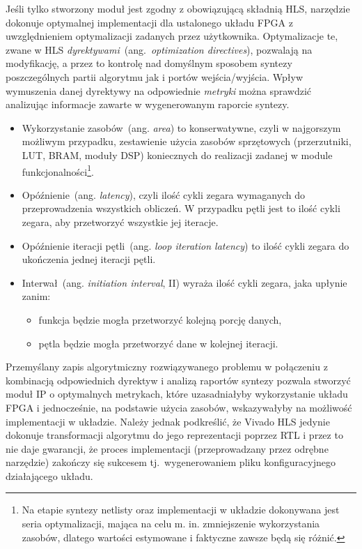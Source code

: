 Jeśli tylko stworzony moduł jest zgodny z obowiązującą składnią HLS, narzędzie dokonuje optymalnej implementacji dla ustalonego układu FPGA z uwzględnieniem optymalizacji zadanych przez użytkownika. Optymalizacje te, zwane w HLS \textit{dyrektywami}~(ang.~\textit{optimization directives}), pozwalają na modyfikację, a przez to kontrolę nad domyślnym sposobem syntezy poszczególnych partii algorytmu jak i portów wejścia/wyjścia. Wpływ wymuszenia danej dyrektywy na odpowiednie \textit{metryki} można sprawdzić analizując informacje zawarte w wygenerowanym raporcie syntezy.
\begin{itemize}
\item Wykorzystanie zasobów~(ang. \textit{area}) to konserwatywne, czyli w najgorszym możliwym przypadku, zestawienie użycia zasobów sprzętowych (przerzutniki, LUT, BRAM, moduły DSP) koniecznych do realizacji zadanej w module funkcjonalności\footnote{Na etapie syntezy netlisty oraz implementacji w układzie dokonywana jest seria optymalizacji, mająca na celu m. in. zmniejszenie wykorzystania zasobów, dlatego wartości estymowane i faktyczne zawsze będą się różnić.}. 
\item Opóźnienie~(ang. \textit{latency}), czyli ilość cykli zegara wymaganych do przeprowadzenia wszystkich obliczeń. W przypadku pętli jest to ilość cykli zegara, aby przetworzyć wszystkie jej iteracje.
\item Opóźnienie iteracji pętli~(ang. \textit{loop iteration latency}) to ilość cykli zegara do ukończenia jednej iteracji pętli.
\item Interwał~(ang. \textit{initiation interval}, II) wyraża ilość cykli zegara, jaka upłynie zanim:
\begin{itemize}
\item funkcja będzie mogła przetworzyć kolejną porcję danych,
\item pętla będzie mogła przetworzyć dane w kolejnej iteracji.
\end{itemize} 
\end{itemize}
Przemyślany zapis algorytmiczny rozwiązywanego problemu w połączeniu z kombinacją odpowiednich dyrektyw i analizą raportów syntezy pozwala stworzyć moduł IP o optymalnych metrykach, które uzasadniałyby wykorzystanie układu FPGA i jednocześnie, na podstawie użycia zasobów, wskazywałyby na możliwość implementacji w układzie. Należy jednak podkreślić, że Vivado HLS jedynie dokonuje transformacji algorytmu do jego reprezentacji poprzez RTL i przez to nie daje gwarancji, że proces implementacji (przeprowadzany przez odrębne narzędzie) zakończy się sukcesem tj.~wygenerowaniem pliku konfiguracyjnego działającego układu.

